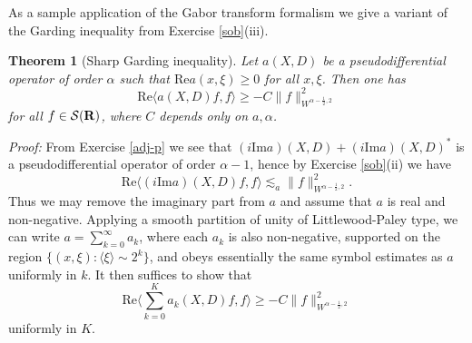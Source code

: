 \documentclass[11pt]{article}
\newtheorem{theorem}{Theorem}
\theoremstyle{definition}
\begin{document}
As a sample application of the Gabor transform formalism we give a variant of the Garding inequality from Exercise \ref{sob}(iii).

\begin{theorem}[Sharp Garding inequality]
  Let \({a(X,D)}\) be a pseudodifferential operator of order \({\alpha}\) such that \({\mathrm{Re} a(x,\xi) \geq 0}\) for all \({x,\xi}\). Then one has 
\[\displaystyle  \mathrm{Re} \langle a(X,D) f, f \rangle \geq -C \|f\|_{W^{\alpha-\frac{1}{2},2}}^2\]
 for all \({f \in {\mathcal S}({\bf R})}\), where \({C}\) depends only on \({a,\alpha}\). 
\end{theorem}

\emph{Proof:}  From Exercise \ref{adj-p} we see that \({(i \mathrm{Im} a)(X,D) + (i \mathrm{Im} a)(X,D)^*}\) is a pseudodifferential operator of order \({\alpha-1}\), hence by Exercise \ref{sob}(ii) we have 
\[\displaystyle  \mathrm{Re} \langle (i \mathrm{Im} a)(X,D) f, f \rangle \lesssim_a \|f\|_{W^{\alpha-\frac{1}{2},2}}^2.\]
 Thus we may remove the imaginary part from \({a}\) and assume that \({a}\) is real and non-negative. Applying a smooth partition of unity of Littlewood-Paley type, we can write \({a = \sum_{k=0}^\infty a_k}\), where each \({a_k}\) is also non-negative, supported on the region \({\{ (x,\xi): \langle \xi \rangle \sim 2^k \}}\), and obeys essentially the same symbol estimates as \({a}\) uniformly in \({k}\). It then suffices to show that 
\[\displaystyle  \mathrm{Re} \langle \sum_{k=0}^K a_k(X,D) f, f \rangle \geq -C \|f\|_{W^{\alpha-\frac{1}{2},2}}^2\]
 uniformly in \({K}\). 
\end{document}
